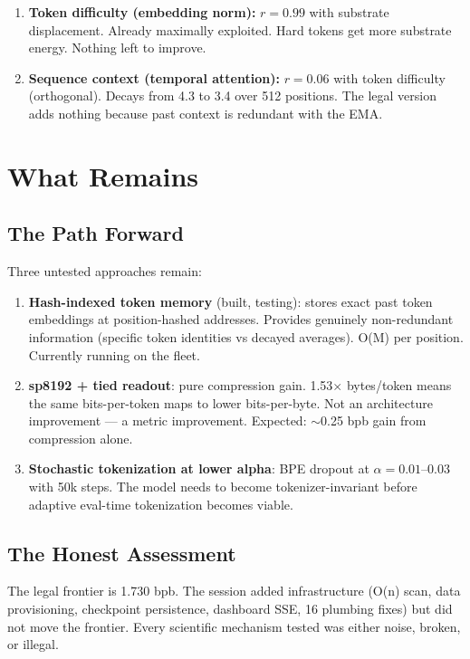 \documentclass[11pt,a4paper]{report}
\begin{document}
\begin{enumerate}
\item \textbf{Token difficulty (embedding norm):} $r=0.99$ with substrate displacement. Already maximally exploited. Hard tokens get more substrate energy. Nothing left to improve.
\item \textbf{Sequence context (temporal attention):} $r=0.06$ with token difficulty (orthogonal). Decays from 4.3 to 3.4 over 512 positions. The legal version adds nothing because past context is redundant with the EMA.
\end{enumerate}


\chapter{What Remains}

\section{The Path Forward}

Three untested approaches remain:

\begin{enumerate}
\item \textbf{Hash-indexed token memory} (built, testing): stores exact past token embeddings at position-hashed addresses. Provides genuinely non-redundant information (specific token identities vs decayed averages). O(M) per position. Currently running on the fleet.

\item \textbf{sp8192 + tied readout}: pure compression gain. 1.53$\times$ bytes/token means the same bits-per-token maps to lower bits-per-byte. Not an architecture improvement --- a metric improvement. Expected: $\sim$0.25 bpb gain from compression alone.

\item \textbf{Stochastic tokenization at lower alpha}: BPE dropout at $\alpha=0.01$--$0.03$ with 50k steps. The model needs to become tokenizer-invariant before adaptive eval-time tokenization becomes viable.
\end{enumerate}

\section{The Honest Assessment}

The legal frontier is 1.730 bpb. The session added infrastructure (O(n) scan, data provisioning, checkpoint persistence, dashboard SSE, 16 plumbing fixes) but did not move the frontier. Every scientific mechanism tested was either noise, broken, or illegal.
\end{document}
